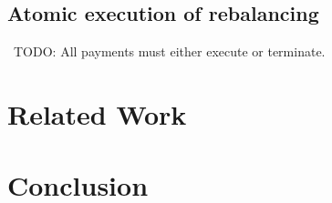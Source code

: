 \documentclass[12pt]{article}
\newcommand{\todo}[1]{{\color{red}\ TODO: {#1}}}
\begin{document}
\subsection{Atomic execution of rebalancing}
\todo{All payments must either execute or terminate.}








\section{Related Work}
\section{Conclusion}



\end{document}
